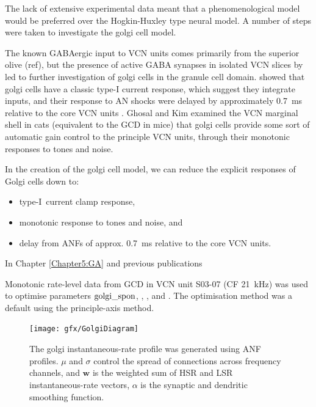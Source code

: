 \medskip{}

The lack of extensive experimental data meant that a phenomenological model
would be preferred over the Hogkin-Huxley type neural model. A number of steps
were taken to investigate the golgi cell model.

The known GABAergic input to VCN units comes primarily from the superior olive
(ref), but the presence of active GABA synapses in isolated VCN slices by
\citet{FerragamoGoldingEtAl:1998} led to further investigation of
golgi cells in the granule cell domain. \citet{FerragamoGoldingEtAl:1998a}
showed that golgi cells have a classic type-I current
response, which suggest they integrate inputs, and their response to
AN shocks were delayed by approximately 0.7~ms relative to the core
VCN units .  Ghosal and Kim
\citet{GhoshalKim:1997} examined the VCN marginal shell in cats (equivalent to the
GCD in mice) that golgi cells provide some sort of
automatic gain control to the principle VCN units, through their monotonic
responses to tones and noise.

\medskip{}

   

In the creation of the golgi cell model, we can reduce the explicit
responses of Golgi cells down to:\begin{itemize}\setlength{\itemsep}{-1em}
\item type-I~current clamp response,
\item monotonic response to tones and noise, and
\item delay from ANFs of approx. 0.7~ms relative to the core VCN units.
\end{itemize}

In Chapter \ref{Chapter5:GA} and previous publications \citep{EagerGraydenEtAl:2006a}




Monotonic rate-level data from GCD in VCN \citep{GhoshalKim:1996} unit S03-07
(CF 21~kHz) was used to optimise parameters ${\rm golgi\_spon}$, \wLSRGLG,
\wHSRGLG, and  \sANFGLG.  The optimisation method was a default  using the principle-axis method.

\begin{figure}[hp!]
  \centering
  \texttt{[image: gfx/GolgiDiagram]}
  \caption{ The golgi instantaneous-rate profile was generated using ANF
    profiles. $\mu$ and $\sigma$ control the spread of connections
    across frequency channels, and $\mathbf{w}$ is
    the weighted sum of HSR and LSR instantaneous-rate vectors,
    $\alpha$ is the synaptic and dendritic smoothing function.}
\end{figure}



